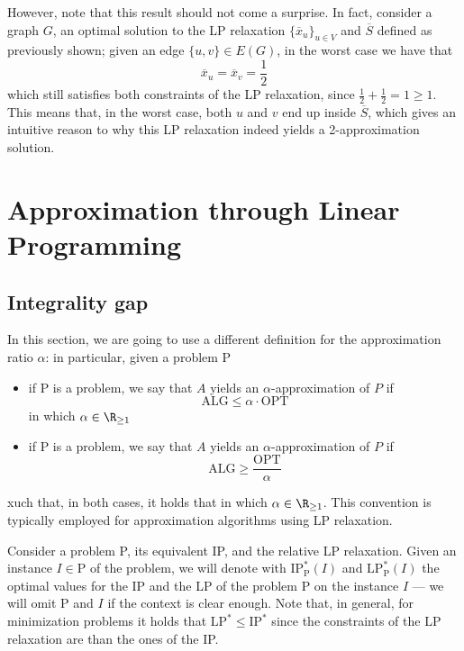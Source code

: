 \documentclass[a4paper, 12pt]{report}
\begin{document}
    However, note that this result should not come a surprise. In fact, consider a graph $G$, an optimal solution to the LP relaxation $\{\overline x_u\}_{u \in V}$ and $\overline S$ defined as previously shown; given an edge $\{u, v\} \in E(G)$, in the worst case we have that $$\overline x_u = \overline x_v = \dfrac{1}{2}$$ which still satisfies both constraints of the LP relaxation, since $\tfrac{1}{2} + \tfrac{1}{2} = 1 \ge 1$. This means that, in the worst case, both $u$ and $v$ end up inside $\overline S$, which gives an intuitive reason to why this LP relaxation indeed yields a 2-approximation solution.

    \section{Approximation through Linear Programming}

    \subsection{Integrality gap}

    In this section, we are going to use a different definition for the approximation ratio $\alpha$: in particular, given a problem P

    \begin{itemize}
        \item if P is a  problem, we say that $A$ yields an $\alpha$-approximation of $P$ if $$\mathrm{ALG} \le \alpha \cdot \mathrm{OPT}$$ in which $\alpha \in \R_{\ge 1}$
        \item if P is a  problem, we say that $A$ yields an $\alpha$-approximation of $P$ if $$\mathrm{ALG} \ge \dfrac{\mathrm{OPT}}{\alpha}$$ 
    \end{itemize}

    xuch that, in both cases, it holds that in which $\alpha \in \R_{\ge 1}$. This convention is typically employed for approximation algorithms using LP relaxation.

    Consider a problem P, its equivalent IP, and the relative LP relaxation. Given an instance $I \in \mathrm P$ of the problem, we will denote with $\mathrm{IP^*_P}(I)$ and $\mathrm{LP^*_P}(I)$ the optimal values for the IP and the LP of the problem P on the instance $I$ --- we will omit P and $I$ if the context is clear enough. Note that, in general, for minimization problems it holds that $\mathrm{LP^*} \le \mathrm{IP^*}$ since the constraints of the LP relaxation are  than the ones of the IP.
\end{document}
